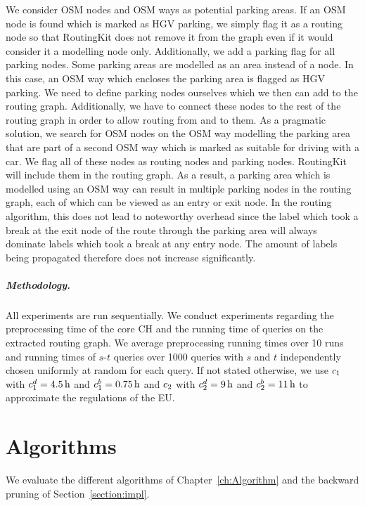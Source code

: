 We consider OSM nodes and OSM ways as potential parking areas. If an OSM node is found which is marked as HGV parking, we simply flag it as a routing node so that RoutingKit does not remove it from the graph even if it would consider it a modelling node only. Additionally, we add a parking flag for all parking nodes. Some parking areas are modelled as an area instead of a node. In this case, an OSM way which encloses the parking area is flagged as HGV parking. We need to define parking nodes ourselves which we then can add to the routing graph. Additionally, we have to connect these nodes to the rest of the routing graph in order to allow routing from and to them. As a pragmatic solution, we search for OSM nodes on the OSM way modelling the parking area that are part of a second OSM way which is marked as suitable for driving with a car. We flag all of these nodes as routing nodes and parking nodes. RoutingKit will include them in the routing graph. As a result, a parking area which is modelled using an OSM way can result in multiple parking nodes in the routing graph, each of which can be viewed as an entry or exit node. In the routing algorithm, this does not lead to noteworthy overhead since the label which took a break at the exit node of the route through the parking area will always dominate labels which took a break at any entry node. The amount of labels being propagated therefore does not increase significantly.


\subparagraph{Methodology.} All experiments are run sequentially. We conduct experiments regarding the preprocessing time of the core CH and the running time of queries on the extracted routing graph. We average preprocessing running times over \num{10} runs and running times of $s$-$t$ queries over \num{1000} queries with $s$ and $t$ independently chosen uniformly at random for each query. If not stated otherwise, we use $c_1$ with $c_1^d = \SI{4.5}{\hour}$ and $c_1^b = \SI{0.75}{\hour}$ and $c_2$ with $c_2^d = \SI{9}{\hour}$ and $c_2^b = \SI{11}{\hour}$ to approximate the regulations of the EU.

\section{Algorithms}
We evaluate the different algorithms of Chapter~\ref{ch:Algorithm} and the backward pruning of Section~\ref{section:impl}.

